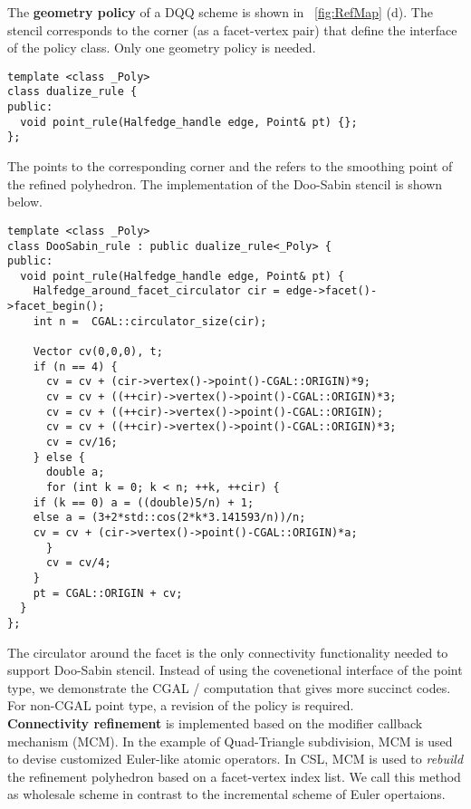 \noindent The \textbf{geometry policy} of a DQQ scheme is shown in
\figurename\ \ref{fig:RefMap} (d). The stencil corresponds to
the corner (as a facet-vertex pair) that define the interface 
of the policy class. Only one geometry policy is needed. 
\begin{lstlisting}
template <class _Poly>
class dualize_rule {
public:
  void point_rule(Halfedge_handle edge, Point& pt) {};
};
\end{lstlisting}
The  points to the corresponding
corner and the  refers to the smoothing point
of the refined polyhedron. The implementation of the
Doo-Sabin stencil is shown below.
\begin{lstlisting}
template <class _Poly>
class DooSabin_rule : public dualize_rule<_Poly> {
public:
  void point_rule(Halfedge_handle edge, Point& pt) {
    Halfedge_around_facet_circulator cir = edge->facet()->facet_begin();
    int n =  CGAL::circulator_size(cir); 

    Vector cv(0,0,0), t;
    if (n == 4) {
      cv = cv + (cir->vertex()->point()-CGAL::ORIGIN)*9;
      cv = cv + ((++cir)->vertex()->point()-CGAL::ORIGIN)*3;
      cv = cv + ((++cir)->vertex()->point()-CGAL::ORIGIN);
      cv = cv + ((++cir)->vertex()->point()-CGAL::ORIGIN)*3;
      cv = cv/16;
    } else {
      double a;
      for (int k = 0; k < n; ++k, ++cir) {
	if (k == 0) a = ((double)5/n) + 1;
	else a = (3+2*std::cos(2*k*3.141593/n))/n;
	cv = cv + (cir->vertex()->point()-CGAL::ORIGIN)*a;
      }
      cv = cv/4;
    }
    pt = CGAL::ORIGIN + cv;
  }
};
\end{lstlisting}
The circulator around the facet is the only connectivity
functionality needed to support Doo-Sabin stencil.
Instead of using the covenetional interface \CodeFmt{[i]} 
of the point type, we demonstrate the CGAL 
/ computation that gives
more succinct codes. For non-CGAL point type, a revision
of the policy is required. 
\\

\noindent \textbf{Connectivity refinement} is implemented
based on the modifier callback mechanism (MCM). In the example of 
Quad-Triangle subdivision, MCM is used to devise 
customized Euler-like atomic operators.
In CSL, MCM is used to \emph{rebuild} the refinement
polyhedron based on a facet-vertex index list.
We call this method as wholesale scheme in contrast to
the incremental scheme of Euler opertaions.

